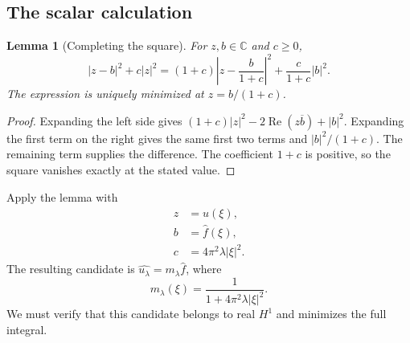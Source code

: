 \documentclass[11pt]{article}
\numberwithin{equation}{section}
\newtheorem{lemma}[theorem]{Lemma}
\theoremstyle{definition}
\theoremstyle{remark}
\newcommand{\C}{\mathbb C}
\newcommand{\wh}[1]{\widehat{#1}}
\DeclareMathOperator{\RePart}{Re}
\begin{document}
\subsection{The scalar calculation}
\begin{lemma}[Completing the square]\label{lem:square}
For \(z,b\in\C\) and \(c\ge0\),
\begin{equation}\label{eq:square}
 |z-b|^2+c|z|^2
 =(1+c)\left|z-\frac b{1+c}\right|^2
      +\frac c{1+c}|b|^2.
\end{equation}
The expression is uniquely minimized at \(z=b/(1+c)\).
\end{lemma}
\begin{proof}
Expanding the left side gives
\((1+c)|z|^2-2\RePart(z\overline b)+|b|^2\).
Expanding the first term on the right gives the same first two terms and \(|b|^2/(1+c)\). The remaining term supplies the difference. The coefficient \(1+c\) is positive, so the square vanishes exactly at the stated value.
\end{proof}
Apply the lemma with
\begin{align*}
 z&=\wh u(\xi),\\
 b&=\wh f(\xi),\\
 c&=4\pi^2\lambda|\xi|^2.
\end{align*}
The resulting candidate is \(\wh{u_\lambda}=m_\lambda\wh f\), where
\begin{equation}\label{eq:multiplier}
 m_\lambda(\xi)=\frac1{1+4\pi^2\lambda|\xi|^2}.
\end{equation}
We must verify that this candidate belongs to real \(H^1\) and minimizes the full integral.
\end{document}
